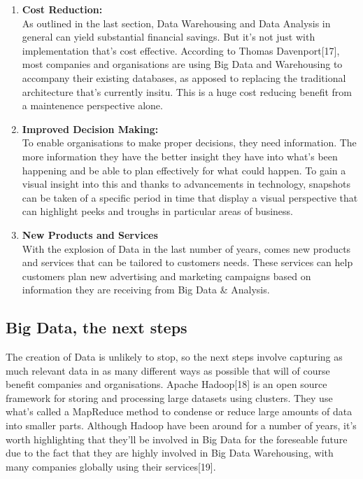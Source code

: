 \documentclass[10pt,journal,compsoc]{IEEEtran}
\begin{document}
\begin{enumerate}
	\item \textbf{Cost Reduction:}\\ As outlined in the last section, Data Warehousing  and Data Analysis in general can yield substantial financial savings. But it's not just with implementation that's cost effective. According to Thomas Davenport[17], most companies and organisations are using Big Data and Warehousing to accompany their existing databases, as apposed to replacing the traditional architecture that's currently insitu. This is a huge cost reducing benefit from a maintenence perspective alone. \\
	
	\item \textbf{Improved Decision Making:}\\ To enable organisations to make proper decisions, they need information. The more information they have the better insight they have into what's been happening and be able to plan effectively for what could happen. To gain a visual insight into this and thanks to advancements in technology, snapshots can be taken of a specific period in time that display a visual perspective that can highlight peeks and troughs in particular areas of business. \\
	
	\item \textbf{New Products and Services}\\ With the explosion of Data in the last number of years, comes new products and services that can be tailored to customers needs. These services can help customers plan new advertising and marketing campaigns based on information they are receiving from Big Data \& Analysis. 
	 
\end{enumerate}


\subsection{Big Data, the next steps}
The creation of Data is unlikely to stop, so the next steps involve capturing as much relevant data in as many different ways as possible that will of course benefit companies and organisations. Apache Hadoop[18] is an open source framework for storing and processing large datasets using clusters. They use what's called a MapReduce method to condense or reduce large amounts of data into smaller parts. Although Hadoop have been around for a number of years, it's worth highlighting that they'll be involved in Big Data for the foreseable future due to the fact that they are highly involved in Big Data Warehousing, with many companies globally using their services[19]. \\
\end{document}
